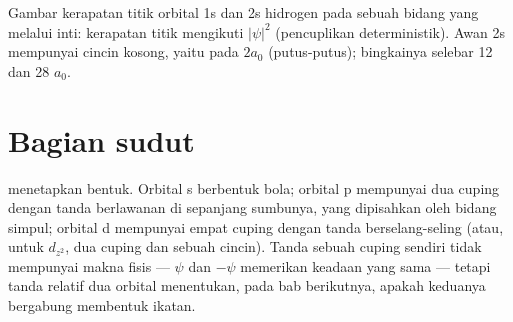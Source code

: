 \begin{omfigure}
\hspace{0.12\linewidth}%

{\small Gambar kerapatan titik orbital 1s dan 2s hidrogen pada sebuah bidang
yang melalui inti: kerapatan titik mengikuti $|\psi|^2$ (pencuplikan
deterministik). Awan 2s mempunyai cincin kosong, yaitu  pada
$2a_0$ (putus-putus); bingkainya selebar 12 dan 28 $a_0$.}
\end{omfigure}

\section{Bagian sudut}

 menetapkan bentuk. Orbital s berbentuk bola; orbital p
mempunyai dua cuping dengan tanda berlawanan di sepanjang sumbunya, yang
dipisahkan oleh bidang simpul; orbital d mempunyai empat cuping dengan
tanda berselang-seling (atau, untuk $d_{z^2}$, dua cuping dan sebuah
cincin). Tanda sebuah cuping sendiri tidak mempunyai makna fisis ---
$\psi$ dan $-\psi$ memerikan keadaan yang sama --- tetapi tanda relatif dua
orbital menentukan, pada bab berikutnya, apakah keduanya bergabung
membentuk ikatan.

